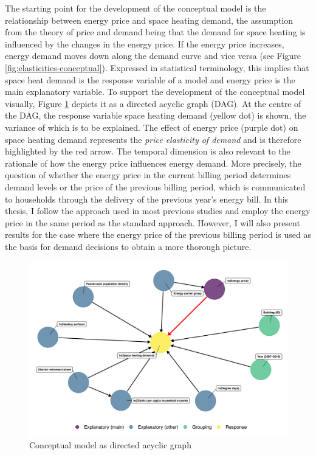 \documentclass[12pt,twoside]{reedthesis}
\begin{document}
The starting point for the development of the conceptual model is the relationship between energy price and space heating demand, the assumption from the theory of price and demand being that the demand for space heating is influenced by the changes in the energy price. If the energy price increases, energy demand moves down along the demand curve and vice versa (see Figure \ref{fig:elasticities-conceptual}). Expressed in statistical terminology, this implies that space heat demand is the response variable of a model and energy price is the main explanatory variable. To support the development of the conceptual model visually, Figure \ref{fig:dag} depicts it as a directed acyclic graph (DAG). At the centre of the DAG, the response variable space heating demand (yellow dot) is shown, the variance of which is to be explained. The effect of energy price (purple dot) on space heating demand represents the \emph{price elasticity of demand} and is therefore highlighted by the red arrow. The temporal dimension is also relevant to the rationale of how the energy price influences energy demand. More precisely, the question of whether the energy price in the current billing period determines demand levels or the price of the previous billing period, which is communicated to households through the delivery of the previous year's energy bill. In this thesis, I follow the approach used in most previous studies and employ the energy price in the same period as the standard approach. However, I will also present results for the case where the energy price of the previous billing period is used as the basis for demand decisions to obtain a more thorough picture.
\begin{figure}

{\centering \includegraphics[width=1\linewidth]{figure/dag_red} 

}

\caption[Conceptual model as directed acyclic graph]{Conceptual model as directed acyclic graph}\label{fig:dag}
\end{figure}
\end{document}
